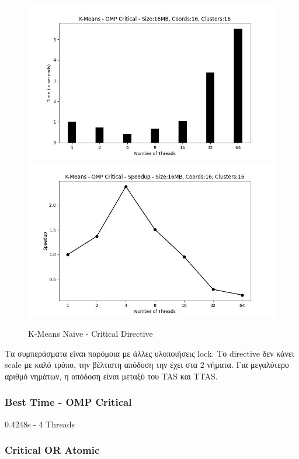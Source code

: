 \documentclass[../final_report.tex]{subfiles}
\begin{document}
\begin{figure}[H]
    \centering
        \includegraphics[scale=0.4]{outFilesAffinityMouliko/plots/kmeans_locks_critical.jpg}
        \includegraphics[scale=0.4]{outFilesAffinityMouliko/plots/kmeans_locks_critical_speedup.jpg}
    \caption{K-Means Naive - Critical Directive}
    \label{fig:K-Means Naive - Critical Directive}
\end{figure}

Τα συμπεράσματα είναι παρόμοια με άλλες υλοποιήσεις lock. Το directive δεν κάνει scale με καλό τρόπο, την 
βέλτιστη απόδοση την έχει στα 2 νήματα. Για μεγαλύτερο αριθμό νημάτων, η απόδοση είναι μεταξύ του TAS και TTAS.

\subsubsection*{Best Time - OMP Critical}
0.4248s - 4 Threads

\subsubsection*{Critical OR Atomic}
\end{document}
